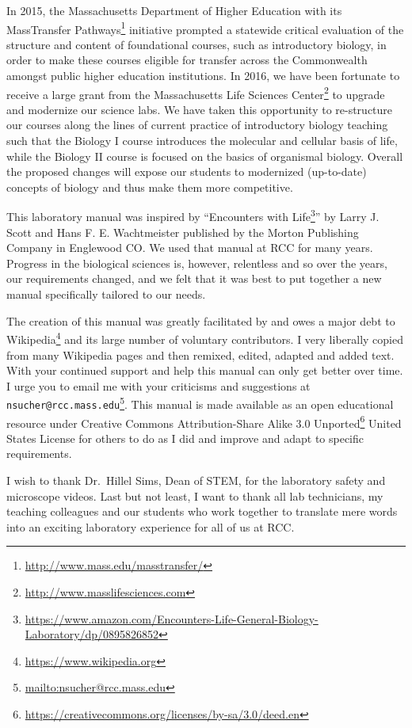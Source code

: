 \documentclass[]{book}
\let\rmarkdownfootnote\footnote%
\def\footnote{\protect\rmarkdownfootnote}
\renewcommand{\href}[2]{#2\footnote{\url{#1}}}
\begin{document}
In 2015, the Massachusetts Department of Higher Education with its \href{http://www.mass.edu/masstransfer/}{MassTransfer Pathways} initiative prompted a statewide critical evaluation of the structure and content of foundational courses, such as introductory biology, in order to make these courses eligible for transfer across the Commonwealth amongst public higher education institutions. In 2016, we have been fortunate to receive a large grant from the \href{http://www.masslifesciences.com}{Massachusetts Life Sciences Center} to upgrade and modernize our science labs. We have taken this opportunity to re-structure our courses along the lines of current practice of introductory biology teaching such that the Biology I course introduces the molecular and cellular basis of life, while the Biology II course is focused on the basics of organismal biology. Overall the proposed changes will expose our students to modernized (up-to-date) concepts of biology and thus make them more competitive.

This laboratory manual was inspired by ``\href{https://www.amazon.com/Encounters-Life-General-Biology-Laboratory/dp/0895826852}{Encounters with Life}'' by Larry J. Scott and Hans F. E. Wachtmeister published by the Morton Publishing Company in Englewood CO. We used that manual at RCC for many years. Progress in the biological sciences is, however, relentless and so over the years, our requirements changed, and we felt that it was best to put together a new manual specifically tailored to our needs.

The creation of this manual was greatly facilitated by and owes a major debt to \href{https://www.wikipedia.org}{Wikipedia} and its large number of voluntary contributors. I very liberally copied from many Wikipedia pages and then remixed, edited, adapted and added text. With your continued support and help this manual can only get better over time. I urge you to email me with your criticisms and suggestions at \href{mailto:nsucher@rcc.mass.edu}{\nolinkurl{nsucher@rcc.mass.edu}}. This manual is made available as an open educational resource under \href{https://creativecommons.org/licenses/by-sa/3.0/deed.en}{Creative Commons Attribution-Share Alike 3.0 Unported} United States License for others to do as I did and improve and adapt to specific requirements.

I wish to thank Dr.~Hillel Sims, Dean of STEM, for the laboratory safety and microscope videos. Last but not least, I want to thank all lab technicians, my teaching colleagues and our students who work together to translate mere words into an exciting laboratory experience for all of us at RCC.
\end{document}
